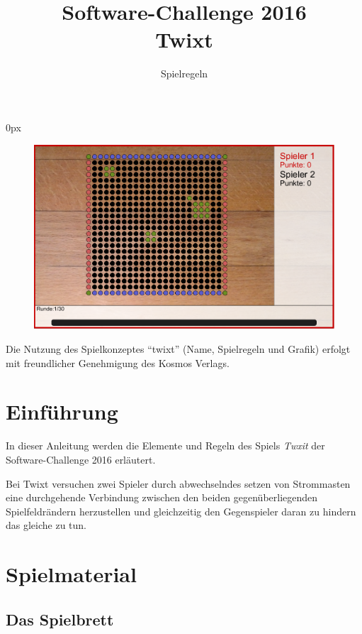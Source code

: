 \documentclass[a4paper, ngerman]{scrartcl}
\title{Software-Challenge 2016 \\ Twixt}
\subtitle{Spielregeln}
\begin{document}
\parindent0px
\maketitle

\begin{figure}[h!]
        \centering
        \includegraphics[width=\linewidth]{bilder/gui.png}
\end{figure}
\vspace*{\fill}

Die Nutzung des Spielkonzeptes "`twixt"' (Name, Spielregeln und Grafik)
erfolgt mit freundlicher Genehmigung des Kosmos Verlags.

\newpage

\tableofcontents

\newpage

\section{Einführung}

In dieser Anleitung werden die Elemente und Regeln des Spiels \emph{Twxit} der
Software-Challenge 2016 erläutert.

Bei Twixt versuchen zwei Spieler durch abwechselndes setzen von Strommasten eine
durchgehende Verbindung zwischen den beiden gegenüberliegenden Spielfeldrändern
herzustellen und gleichzeitig den Gegenspieler daran zu hindern das gleiche zu
tun.

\section{Spielmaterial}

\subsection{Das Spielbrett}
\end{document}
